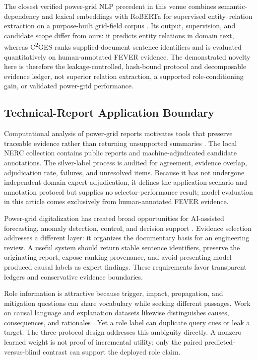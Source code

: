 \documentclass[applsci,article,submit,moreauthors]{Definitions/mdpi}
\newcommand{\cges}{C\textsuperscript{2}GES}
\begin{document}
The closest verified power-grid NLP precedent in this venue combines semantic-dependency and lexical embeddings with RoBERTa for supervised entity--relation extraction on a purpose-built grid-field corpus \cite{meng2023gridfield}. Its output, supervision, and candidate scope differ from ours: it predicts entity relations in domain text, whereas \cges{} ranks supplied-document sentence identifiers and is evaluated quantitatively on human-annotated FEVER evidence. The demonstrated novelty here is therefore the leakage-controlled, hash-bound protocol and decomposable evidence ledger, not superior relation extraction, a supported role-conditioning gain, or validated power-grid performance.

\subsection{Technical-Report Application Boundary}
Computational analysis of power-grid reports motivates tools that preserve traceable evidence rather than returning unsupported summaries \cite{xie2022massively,hamann2024foundation,madabhushi2023survey}. The local NERC collection contains public reports and machine-adjudicated candidate annotations. The silver-label process is audited for agreement, evidence overlap, adjudication rate, failures, and unresolved items. Because it has not undergone independent domain-expert adjudication, it defines the application scenario and annotation protocol but supplies no selector-performance result; model evaluation in this article comes exclusively from human-annotated FEVER evidence.

Power-grid digitalization has created broad opportunities for AI-assisted forecasting, anomaly detection, control, and decision support \cite{xie2022massively,srinivasan2023artificial,ranawaka2024leveraging}. Evidence selection addresses a different layer: it organizes the documentary basis for an engineering review. A useful system should return stable sentence identifiers, preserve the originating report, expose ranking provenance, and avoid presenting model-produced causal labels as expert findings. These requirements favor transparent ledgers and conservative evidence boundaries.

Role information is attractive because trigger, impact, propagation, and mitigation questions can share vocabulary while seeking different passages. Work on causal language and explanation datasets likewise distinguishes causes, consequences, and rationales \cite{feder2022causal,du2022ecare}. Yet a role label can duplicate query cues or leak a target. The three-protocol design addresses this ambiguity directly. A nonzero learned weight is not proof of incremental utility; only the paired predicted-versus-blind contrast can support the deployed role claim.
\end{document}
